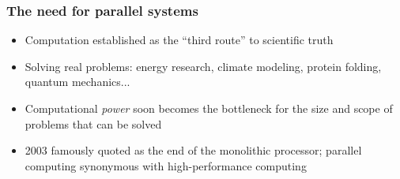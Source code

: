 \documentclass[8pt]{beamer}
\begin{document}
\begin{frame}
\frametitle{The need for parallel systems}
\pause
\begin{itemize}[<+->]
    \item Computation established as the ``third route''
        to scientific truth
    \item Solving real problems:
        energy research,
        climate modeling,
        protein folding,
        quantum mechanics...
    \item Computational \emph{power} soon becomes
        the bottleneck for the size and scope of
        problems that can be solved
    \item 2003 famously quoted as the end
        of the monolithic processor;
        parallel computing synonymous with
        high-performance computing
\end{itemize}
\end{frame}
\end{document}
